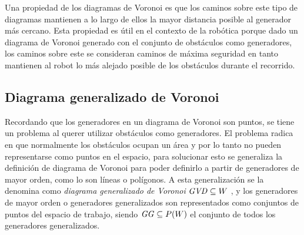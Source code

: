 Una propiedad de los diagramas de Voronoi es que los caminos sobre este tipo de diagramas mantienen a lo largo de ellos la mayor distancia posible al generador más cercano.
Esta propiedad es útil en el contexto de la robótica porque dado un diagrama de Voronoi generado con el conjunto de obstáculos como generadores, los caminos sobre este se consideran caminos de máxima seguridad en tanto mantienen al robot lo más alejado posible de los obstáculos durante el recorrido.


\subsection{Diagrama generalizado de Voronoi}\label{subsec:GVD}
Recordando que los generadores en un diagrama de Voronoi son puntos, se tiene un problema al querer utilizar obstáculos como generadores. El problema radica en que normalmente los obstáculos ocupan un área y por lo tanto no pueden representarse como puntos en el espacio, para solucionar esto se generaliza la definición de diagrama de Voronoi para poder definirlo a partir de generadores de mayor orden, como lo son líneas o polígonos. A esta generalización se la denomina como \emph{diagrama generalizado de Voronoi} $\mathit{GVD}\subseteq W$ , y los generadores de mayor orden o generadores generalizados son representados como conjuntos de puntos del espacio de trabajo, siendo $\mathit{GG}\subseteq P(W)$ el conjunto de todos los generadores generalizados.


